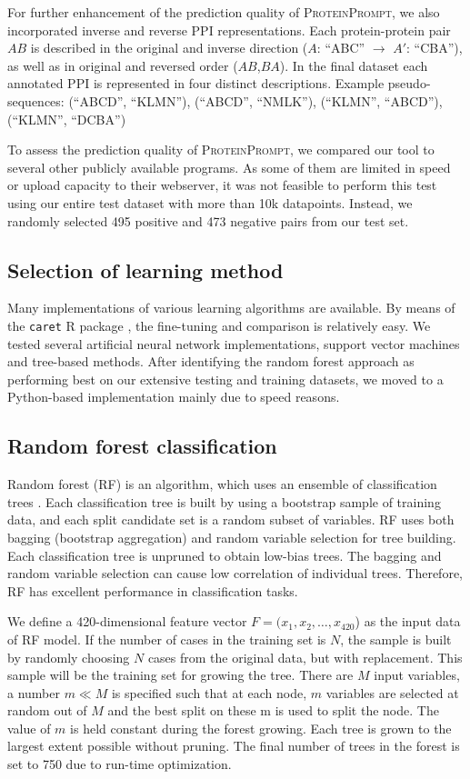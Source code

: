 \documentclass[3p,times,twocolumn]{elsarticle}
\newcommand{\tool}{\textsc{ProteinPrompt}}
\begin{document}
For further enhancement of the prediction
quality of \tool, we also incorporated inverse and reverse PPI
representations. Each protein-protein pair $AB$ is described in the
original and inverse direction ($A$: ``ABC'' $\rightarrow$ $A'$:  ``CBA''),
as well as in original and reversed order ($AB$,$BA$).
In the final dataset each annotated PPI is represented
in four distinct descriptions. Example pseudo-sequences: (``ABCD'', ``KLMN''),
  (``ABCD'', ``NMLK''), (``KLMN'', ``ABCD''), (``KLMN'', ``DCBA'')

To assess the prediction quality of \tool, we compared our tool to
several other publicly available programs. As some of them are limited
in speed or upload capacity to their webserver, it was not
feasible to perform this test using our entire test dataset with more
than 10k datapoints. Instead, we randomly selected 495 positive and 473
negative pairs from our test set.


\subsection{Selection of learning method}
Many implementations of various learning algorithms are
available. By means of the \texttt{caret} R package \cite{Kuhn:2008},
the fine-tuning and comparison is relatively easy. We tested several
artificial neural network implementations, support vector machines and
tree-based methods. After identifying the random forest approach as
performing best on our extensive testing and training datasets,
we moved to a Python-based implementation mainly
due to speed reasons.  


\subsection{Random forest classification}
Random forest (RF) is an algorithm, which uses an ensemble of
classification trees \cite{Breiman:2001}. Each classification tree is built by using a
bootstrap sample of training data, and each split candidate set is a
random subset of variables. RF uses both bagging (bootstrap
aggregation) and random variable selection for tree building. Each
classification tree is unpruned to obtain low-bias trees. The bagging
and random variable selection can cause low correlation of individual
trees. Therefore, RF has excellent performance in classification
tasks. 

We define a 420-dimensional feature vector $F=(x_1,x_2,
\dots,x_{420}$) as the input data of RF model. If the number of cases
in the training set is $N$, the sample is built by randomly choosing
$N$ cases from the original data, but with replacement. This sample
will be the training set for growing the tree. There are $M$ input
variables, a number $m \ll M$ is specified such that at each node, $m$
variables are selected at random out of $M$ and the best split on
these m is used to split the node. The value of $m$ is held constant
during the forest growing. Each tree is grown to the largest extent
possible without pruning. The final number of trees in the forest is
set to 750 due to run-time optimization. 
\end{document}

